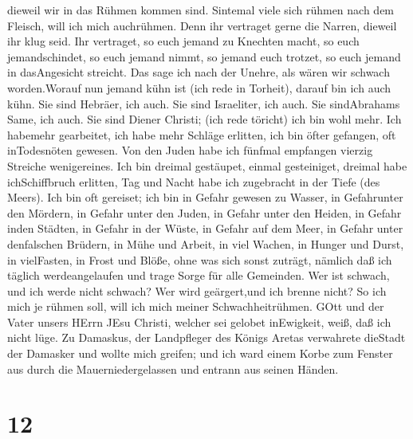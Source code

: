 dieweil wir in das Rühmen kommen sind.  Sintemal viele sich
rühmen nach dem Fleisch, will ich mich auchrühmen.  Denn
ihr vertraget gerne die Narren, dieweil ihr klug seid.  Ihr
vertraget, so euch jemand zu Knechten macht, so euch jemandschindet, so
euch jemand nimmt, so jemand euch trotzet, so euch jemand in
dasAngesicht streicht.  Das sage ich nach der Unehre, als
wären wir schwach worden.Worauf nun jemand kühn ist (ich rede in
Torheit), darauf bin ich auch kühn.  Sie sind Hebräer, ich
auch. Sie sind Israeliter, ich auch. Sie sindAbrahams Same, ich auch.
 Sie sind Diener Christi; (ich rede töricht) ich bin wohl
mehr. Ich habemehr gearbeitet, ich habe mehr Schläge erlitten, ich bin
öfter gefangen, oft inTodesnöten gewesen.  Von den Juden
habe ich fünfmal empfangen vierzig Streiche wenigereines. 
Ich bin dreimal gestäupet, einmal gesteiniget, dreimal habe
ichSchiffbruch erlitten, Tag und Nacht habe ich zugebracht in der Tiefe
(des Meers).  Ich bin oft gereiset; ich bin in Gefahr
gewesen zu Wasser, in Gefahrunter den Mördern, in Gefahr unter den
Juden, in Gefahr unter den Heiden, in Gefahr inden Städten, in Gefahr in
der Wüste, in Gefahr auf dem Meer, in Gefahr unter denfalschen Brüdern,
 in Mühe und Arbeit, in viel Wachen, in Hunger und Durst,
in vielFasten, in Frost und Blöße,  ohne was sich sonst
zuträgt, nämlich daß ich täglich werdeangelaufen und trage Sorge für
alle Gemeinden.  Wer ist schwach, und ich werde nicht
schwach? Wer wird geärgert,und ich brenne nicht?  So ich
mich je rühmen soll, will ich mich meiner Schwachheitrühmen.
 GOtt und der Vater unsers HErrn JEsu Christi, welcher sei
gelobet inEwigkeit, weiß, daß ich nicht lüge.  Zu Damaskus,
der Landpfleger des Königs Aretas verwahrete dieStadt der Damasker und
wollte mich greifen;  und ich ward einem Korbe zum Fenster
aus durch die Mauerniedergelassen und entrann aus seinen Händen.

\hypertarget{section-11}{%
\section{12}\label{section-11}}

